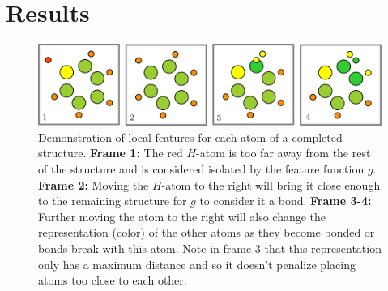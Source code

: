 \section{Results}
\begin{figure}
	\centering
	\centerline{
		\includegraphics[width=1.4\columnwidth]{graphics/bonding_demo.pdf}
	} %
	\captionsetup{width=1.2\columnwidth}
	\caption{Demonstration of local features for each atom of a completed structure. 
		\textbf{Frame 1:} The red $H$-atom is too far away from the rest of the structure and is considered isolated by the feature function $g$. 
		\textbf{Frame 2:} Moving the $H$-atom to the right will bring it close enough to the remaining structure for $g$ to consider it a bond.
		\textbf{Frame 3-4:} Further moving the atom to the right will also change the representation (color) of the other atoms as they become bonded or bonds break with this atom. Note in frame 3 that this representation only has a maximum distance and so it doesn't penalize placing atoms too close to each other.}
	\label{fig:bonding_demo}
\end{figure}



